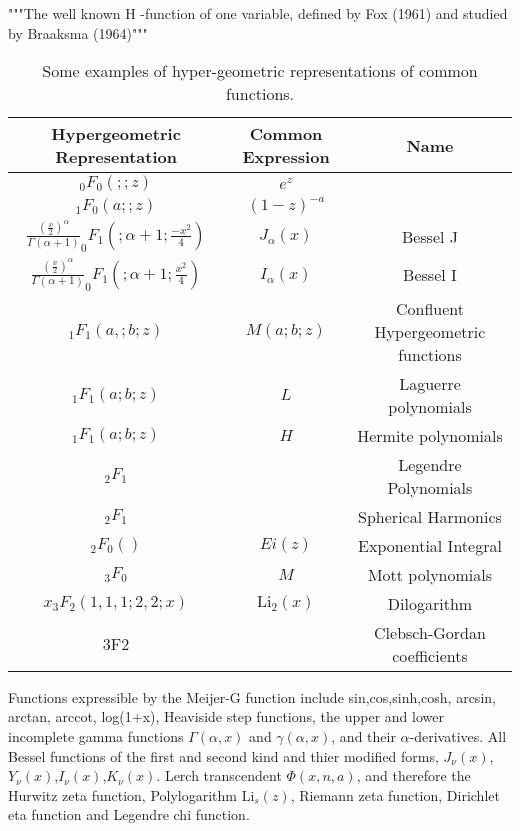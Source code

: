 \documentclass[journal=jcisd8,manuscript=article,layout=onecolumn,pdftex,floatfix,amsmath,amssymb,10pt]{achemso}
\begin{document}
"""The well known H -function of one variable, defined by Fox (1961) and
studied by Braaksma (1964)""" \citep{Rathie1997}

\begin{table}
\begin{tabular}{|c|c|c|}
\hline
Hypergeometric Representation & Common Expression & Name\\
\hline
$_0F_0(;;z)$&$e^z$ &\\
$_1F_0(a;;z)$ & $(1-z)^{-a}$ &\\
$\frac{(\frac{x}{2})^\alpha}{\Gamma(\alpha+1)} _0F_1(;\alpha+1;\frac{-x^2}{4}) $ & $J_\alpha(x)$ & Bessel J \\
$\frac{(\frac{x}{2})^\alpha}{\Gamma(\alpha+1)} _0F_1(;\alpha+1;\frac{x^2}{4}) $ & $I_\alpha(x)$ & Bessel I \\
$_1F_1(a,;b;z)$ & $M(a;b;z)$ & Confluent Hypergeometric functions \\
$_1F_1(a;b;z)$ & $L$ & Laguerre polynomials \\
$_1F_1(a;b;z)$ & $H$ & Hermite polynomials\\
$_2F_1$ & & Legendre Polynomials\\
$_2F_1$ & & Spherical Harmonics \\
$_2F_0()$ & $Ei(z)$ & Exponential Integral \\
$_3F_0$ & $M$ & Mott polynomials \\
$x_3F_2(1,1,1;2,2;x)$ & $\mathrm{Li}_2(x)$ & Dilogarithm \\
3F2 & & Clebsch-Gordan coefficients \\
\hline
\end{tabular}
\caption{Some examples of hyper-geometric representations of common functions.}
\end{table}

Functions expressible by the Meijer-G function include sin,cos,sinh,cosh, arcsin, arctan, arccot, log(1+x), Heaviside step functions, the upper and lower incomplete gamma functions $\Gamma(\alpha,x)$ and $\gamma(\alpha,x)$, and their $\alpha$-derivatives. All Bessel functions of the first and second kind and thier modified forms, $J_\nu(x)$,$Y_\nu(x)$,$I_\nu(x)$,$K_\nu(x)$. Lerch transcendent $\Phi(x,n,a)$, {\color{red} and therefore the Hurwitz zeta function, Polylogarithm $\mathrm{Li}_s(z)$, Riemann zeta function, Dirichlet eta function and Legendre chi function}.
\end{document}
